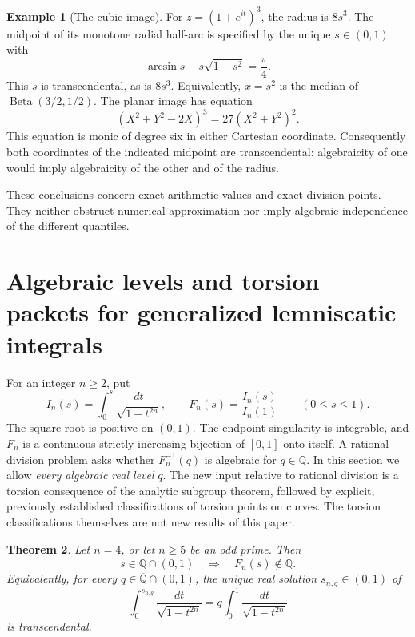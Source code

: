 \documentclass[11pt,a4paper]{article}
\newtheorem{theorem}{Theorem}[section]
\theoremstyle{definition}
\newtheorem{example}[theorem]{Example}
\theoremstyle{remark}
\numberwithin{equation}{section}
\newcommand{\Qbar}{\overline{\mathbb Q}}
\begin{document}
\begin{example}[The cubic image]
\label{bs-cubic-image}
For $z=(1+e^{it})^3$, the radius is $8s^3$.  The midpoint of its
monotone radial half-arc is specified by the unique $s\in(0,1)$ with
\[
 \arcsin s-s\sqrt{1-s^2}=\frac\pi4.
\]
This $s$ is transcendental, as is $8s^3$.  Equivalently,
$x=s^2$ is the median of $\operatorname{Beta}(3/2,1/2)$.
The planar image has equation
\[
 (X^2+Y^2-2X)^3=27(X^2+Y^2)^2.
\]
This equation is monic of degree six in either Cartesian coordinate.
Consequently both coordinates of the indicated midpoint are
transcendental: algebraicity of one would imply algebraicity of the
other and of the radius.
\end{example}

These conclusions concern exact arithmetic values and exact division
points.  They neither obstruct numerical approximation nor imply
algebraic independence of the different quantiles.


\section{Algebraic levels and torsion packets for generalized lemniscatic integrals}
\label{tr-sec}

For an integer $n\geq 2$, put
\begin{equation}\label{tr-def}
 I_n(s)=\int_0^s\frac{dt}{\sqrt{1-t^{2n}}},\qquad
 F_n(s)=\frac{I_n(s)}{I_n(1)}\qquad(0\leq s\leq 1).
\end{equation}
The square root is positive on $(0,1)$.  The endpoint singularity is
integrable, and $F_n$ is a continuous strictly increasing bijection of
$[0,1]$ onto itself.  A rational division problem asks whether
$F_n^{-1}(q)$ is algebraic for $q\in\mathbb Q$.  In this section we allow
\emph{every algebraic real level} $q$.  The new input relative to rational
division is a torsion consequence of the analytic subgroup theorem,
followed by explicit, previously established classifications of torsion
points on curves.  The torsion classifications themselves are not new
results of this paper.

\begin{theorem}\label{tr-main}
Let $n=4$, or let $n\geq 5$ be an odd prime.  Then
\[
 s\in\Qbar\cap(0,1)\quad\Longrightarrow\quad F_n(s)\notin\Qbar.
\]
Equivalently, for every $q\in\Qbar\cap(0,1)$, the unique real solution
$s_{n,q}\in(0,1)$ of
\begin{equation}\label{tr-quantile}
 \int_0^{s_{n,q}}\frac{dt}{\sqrt{1-t^{2n}}}
 =q\int_0^1\frac{dt}{\sqrt{1-t^{2n}}}
\end{equation}
is transcendental.
\end{theorem}
\end{document}
